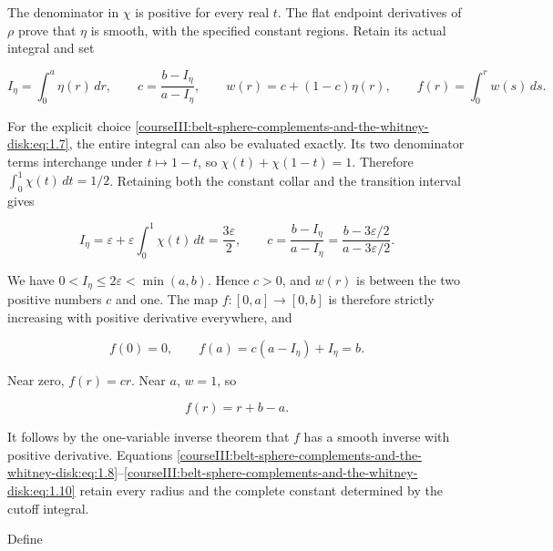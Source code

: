 The denominator in \(\chi\) is positive for every real \(t\). The flat endpoint derivatives of \(\rho\) prove that \(\eta\) is smooth, with the specified constant regions. Retain its actual integral and set

\begin{equation}
I_\eta=\int_0^a\eta(r)\,dr,\qquad
c=\frac{b-I_\eta}{a-I_\eta},\qquad
w(r)=c+(1-c)\eta(r),\qquad
f(r)=\int_0^r w(s)\,ds.
\label{courseIII:belt-sphere-complements-and-the-whitney-disk:eq:1.8}
\end{equation}

For the explicit choice \eqref{courseIII:belt-sphere-complements-and-the-whitney-disk:eq:1.7}, the entire integral can also be evaluated exactly. Its two denominator terms interchange under \(t\mapsto1-t\), so \(\chi(t)+\chi(1-t)=1\). Therefore \(\int_0^1\chi(t)\,dt=1/2\). Retaining both the constant collar and the transition interval gives

\begin{equation}
I_\eta=\varepsilon+\varepsilon\int_0^1\chi(t)\,dt
=\frac{3\varepsilon}{2},\qquad
c=\frac{b-I_\eta}{a-I_\eta}
=\frac{b-3\varepsilon/2}{a-3\varepsilon/2}.
\label{courseIII:belt-sphere-complements-and-the-whitney-disk:eq:1.8a}
\end{equation}

We have \(0<I_\eta\leq2\varepsilon<\min(a,b)\). Hence \(c>0\), and \(w(r)\) is between the two positive numbers \(c\) and one. The map \(f:[0,a]\to[0,b]\) is therefore strictly increasing with positive derivative everywhere, and

\begin{equation}
f(0)=0,\qquad
f(a)=c(a-I_\eta)+I_\eta=b.
\label{courseIII:belt-sphere-complements-and-the-whitney-disk:eq:1.9}
\end{equation}

Near zero, \(f(r)=cr\). Near \(a\), \(w=1\), so

\begin{equation}
f(r)=r+b-a.
\label{courseIII:belt-sphere-complements-and-the-whitney-disk:eq:1.10}
\end{equation}

It follows by the one-variable inverse theorem that \(f\) has a smooth inverse with positive derivative. Equations \eqref{courseIII:belt-sphere-complements-and-the-whitney-disk:eq:1.8}--\eqref{courseIII:belt-sphere-complements-and-the-whitney-disk:eq:1.10} retain every radius and the complete constant determined by the cutoff integral.

Define

